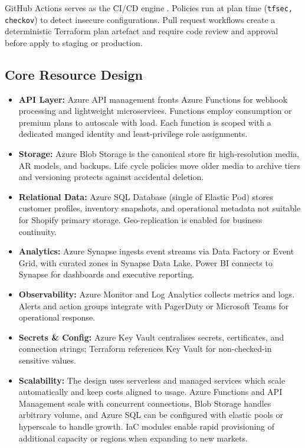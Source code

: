 \documentclass[12pt, a4paper, twoside]{article} %
\begin{document}
GitHub Actions serves as the CI/CD engine \citep{decan2022}. Policies run at plan time (\texttt{tfsec, checkov}) to detect insecure configurations. Pull request workflows create a deterministic Terraform plan artefact and require code review and approval before apply to staging or production.


\subsection{Core Resource Design}
\begin{itemize}
\item \textbf{API Layer:} Azure API management fronts Azure Functions for webhook processing and lightweight microservices. Functions employ consumption or premium plans to autoscale with load. Each function is scoped with a dedicated manged identity and least-privilege role assignments.
\item \textbf{Storage:} Azure Blob Storage is the canonical store fir high-resolution media, AR models, and backups. Life cycle policies move older media to archive tiers and versioning protects against accidental deletion.
\item \textbf{Relational Data:} Azure SQL Database (single of Elastic Pod) stores customer profiles, inventory snapshots, and operational metadata not suitable for Shopify primary storage. Geo-replication is enabled for business continuity.
\item \textbf{Analytics:} Azure Synapse ingests event streams via Data Factory or Event Grid, with curated zones in Synapse Data Lake. Power BI connects to Synapse for dashboards and executive reporting.
\item \textbf{Observability:} Azure Monitor and Log Analytics collects metrics and logs. Alerts and action groups integrate with PagerDuty or Microsoft Teams for operational response. 
\item \textbf{Secrets \& Config:} Azure Key Vault centralises secrets, certificates, and connection strings; Terraform references Key Vault for non-checked-in sensitive values.
\item \textbf{Scalability:} The design uses serverless and managed services which scale automatically and keep costs aligned to usage. Azure Functions and API Management scale with concurrent connections, Blob Storage handles arbitrary volume, and Azure SQL can be configured with elastic pools or hyperscale to handle growth. IaC modules enable rapid provisioning of additional capacity or regions when expanding to new markets.

\end{itemize}
\end{document}
